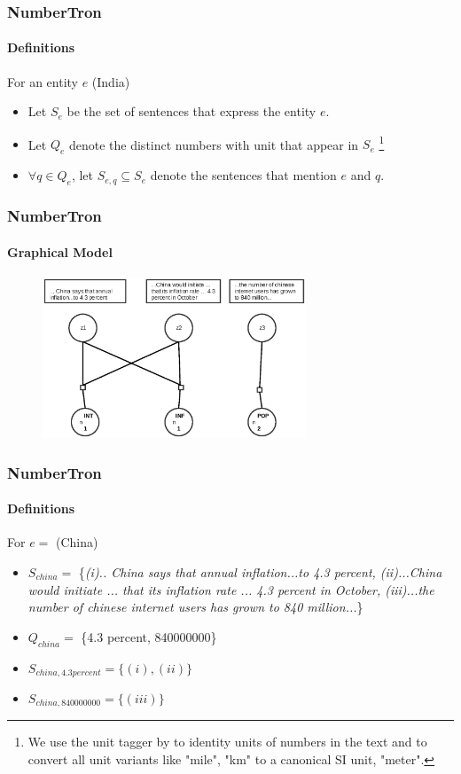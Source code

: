 \documentclass{beamer}
\begin{document}
\begin{frame}
\frametitle{NumberTron}
\framesubtitle{Definitions}
For an entity $e$ (India)
\begin{itemize}
\setlength \itemsep{1em}
 \item Let $S_e$ be the set of sentences that express the entity $e$.
 \item Let $Q_e$ denote the distinct numbers with unit that appear in $S_e$ \footnote{We use the unit tagger by \cite{sarawagi2014} to identity units of numbers in the text and to convert all
unit variants like "mile", "km" to a canonical SI unit, "meter".}
\item $\forall q \in Q_e$, let $S_{e,q} \subseteq S_e$ denote the sentences that mention $e$ and $q$. 
\end{itemize}
\end{frame}

\begin{frame}
 \frametitle{NumberTron}
\framesubtitle{Graphical Model}
\begin{figure}
\includegraphics[width=0.7\textwidth]{images/numbertronmodel.eps}
\end{figure}

\end{frame}


\begin{frame}
\frametitle{NumberTron}
\framesubtitle{Definitions}
For  $e =$ (China)
\begin{itemize}
\setlength \itemsep{1em}
 \item $S_{china} = $  
 \{\textit{\color{blue}(i).. China says that annual inflation...to 4.3 percent, (ii)...China would initiate ... that its inflation rate ... 4.3 percent in October, (iii)...the number of chinese internet users has grown to 840 million...}\}
 \item $Q_{china} = $ \{4.3 percent, 840000000\}
\item $S_{china, 4.3 percent} = \{(i), (ii)\}$ 
\item $S_{china, 840000000} = \{(iii)\}$ 
\end{itemize}
\end{frame}
\end{document}
